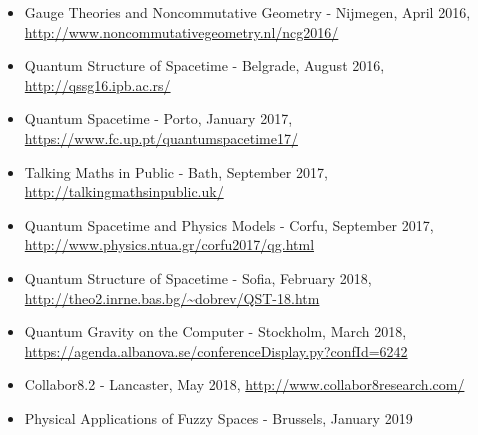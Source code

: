 \documentclass[a4paper,12pt]{article}
\begin{document}
\begin{itemize}
\tightlist
\item
  Gauge Theories and Noncommutative Geometry - Nijmegen, April 2016,
  \url{http://www.noncommutativegeometry.nl/ncg2016/}
\item
  Quantum Structure of Spacetime - Belgrade, August 2016,
  \url{http://qssg16.ipb.ac.rs/}
\item
  Quantum Spacetime - Porto, January 2017,
  \url{https://www.fc.up.pt/quantumspacetime17/}
\item
  Talking Maths in Public - Bath, September 2017,
  \url{http://talkingmathsinpublic.uk/}
\item
  Quantum Spacetime and Physics Models - Corfu, September 2017,
  \url{http://www.physics.ntua.gr/corfu2017/qg.html}
\item
  Quantum Structure of Spacetime - Sofia, February 2018,
  \url{http://theo2.inrne.bas.bg/~dobrev/QST-18.htm}
\item
  Quantum Gravity on the Computer - Stockholm, March 2018,
  \url{https://agenda.albanova.se/conferenceDisplay.py?confId=6242}
\item
  Collabor8.2 - Lancaster, May 2018,
  \url{http://www.collabor8research.com/}
\item
  Physical Applications of Fuzzy Spaces - Brussels, January 2019
\end{itemize}
\end{document}
